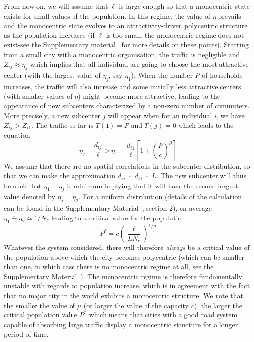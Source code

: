 From now on, we will assume that $\ell$ is large enough so that a
monocentric state exists for small values of the population. In this
regime, the value of $\eta$ prevails and the monocentric state evolves
to an attractivity-driven polycentric structure as the population
increases (if $\ell$ is too small, the monocentric regime does not
exist-see the Supplementary material~\cite{SM} for more details on
these points).  Starting from a small city with a monocentric
organisation, the traffic is negligible and $Z_{ij}\approx \eta_j$
which implies that all individual are going to choose the most
attractive center (with the largest value of $\eta_j$, say
$\eta_1$). When the number $P$ of households increases, the traffic
will also increase and some initially less attractive centers (with
smaller values of $\eta$) might become more attractive, leading to the
appearance of new subcenters characterized by a non-zero number of
commuters. More precisely, a new subcenter $j$ will appear when for an
individual $i$, we have $Z_{ij}>Z_{i1}$. The traffic so far is
$T(1)=P$ and $T(j)=0$ which leads to the equation
\begin{equation}
\eta_j-\frac{d_{ij}}{\ell}>\eta_1-\frac{d_{i1}}{\ell}\left[1+\left(\frac{P}{c}\right)^\mu\right]
\end{equation}
We assume that there are no spatial
correlations in the subcenter distribution, so that we can make the
approximation $d_{ij}\sim d_{i1}\sim L$. The new subcenter will thus
be such that $\eta_1-\eta_j$ is minimum implying that it will have the
second largest value denoted by $\eta_j=\eta_2$. For a uniform distribution
(details of the calculation can be found in the Supplementary
Material~\cite{SM}, section 2), on average
$\overline{\eta_1-\eta_2}\simeq 1/N_c$ leading to a critical value for
the population
%
\begin{equation}
P^*= c \left( \frac{\ell}{L N_c} \right)^{1/\mu}
\end{equation}
%
Whatever the system considered, there will therefore \emph{always} be
a critical value of the population above which the city becomes
polycentric (which can be smaller than one, in which case there is no
monocentric regime at all, see the Supplementary Material~\cite{SM}). The monocentric regime is therefore fundamentally
unstable with regards to population increase, which is in agreement with the fact that no major city in
the world exhibits a monocentric structure. We note that the smaller
the value of $\mu$ (or larger the value of the capacity $c$), the
larger the critical population value $P^*$ which means that cities
with a good road system capable of absorbing large traffic display a
monocentric structure for a longer period of time.


